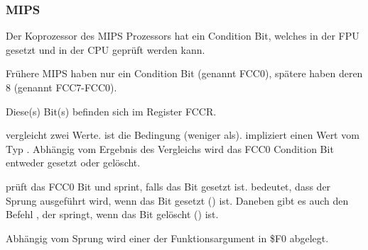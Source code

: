 \subsubsection{MIPS}

Der Koprozessor des MIPS Prozessors hat ein Condition Bit, welches in der FPU
gesetzt und in der CPU geprüft werden kann.

Frühere MIPS haben nur ein Condition Bit (genannt FCC0), spätere haben deren 8
(genannt FCC7-FCC0). 

Diese(s) Bit(s) befinden sich im Register FCCR.



 vergleicht zwei Werte. 
 ist die Bedingung  (weniger als).
 impliziert einen Wert vom Typ \Tdouble.
Abhängig vom Ergebnis des Vergleichs wird das FCC0 Condition Bit entweder
gesetzt oder gelöscht.

 prüft das FCC0 Bit und sprint, falls das Bit gesetzt ist.
 bedeutet, dass der Sprung ausgeführt wird, wenn das Bit gesetzt
() ist.
Daneben gibt es auch den Befehl , der springt, wenn das Bit gelöscht
() ist.

Abhängig vom Sprung wird einer der Funktionsargument in \$F0 abgelegt.
